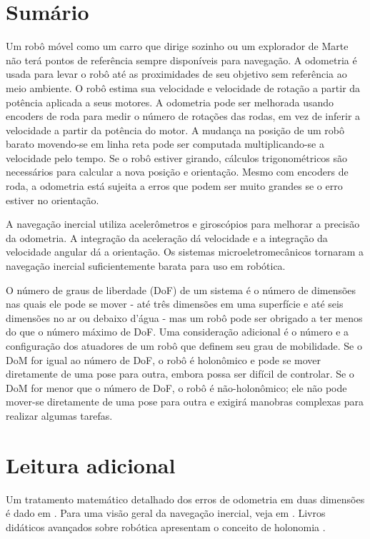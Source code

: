 \section{Sumário}

Um robô móvel como um carro que dirige sozinho ou um explorador de Marte não terá pontos de referência sempre disponíveis para navegação. A odometria é usada para levar o robô até as proximidades de seu objetivo sem referência ao meio ambiente. O robô estima sua velocidade e velocidade de rotação a partir da potência aplicada a seus motores. A odometria pode ser melhorada usando encoders de roda para medir o número de rotações das rodas, em vez de inferir a velocidade a partir da potência do motor. A mudança na posição de um robô barato movendo-se em linha reta pode ser computada multiplicando-se a velocidade pelo tempo. Se o robô estiver girando, cálculos trigonométricos são necessários para calcular a nova posição e orientação. Mesmo com encoders de roda, a odometria está sujeita a erros que podem ser muito grandes se o erro estiver no orientação.

A navegação inercial utiliza acelerômetros e giroscópios para melhorar a precisão da odometria. A integração da aceleração dá velocidade e a integração da velocidade angular dá a orientação. Os sistemas microeletromecânicos tornaram a navegação inercial suficientemente barata para uso em robótica.

O número de graus de liberdade (DoF) de um sistema é o número de dimensões nas quais ele pode se mover - até três dimensões em uma superfície e até seis dimensões no ar ou debaixo d'água - mas um robô pode ser obrigado a ter menos do que o número máximo de DoF. Uma consideração adicional é o número e a configuração dos atuadores de um robô que definem seu grau de mobilidade. Se o DoM for igual ao número de DoF, o robô é holonômico e pode se mover diretamente de uma pose para outra, embora possa ser difícil de controlar. Se o DoM for menor que o número de DoF, o robô é não-holonômico; ele não pode mover-se diretamente de uma pose para outra e exigirá manobras complexas para realizar algumas tarefas.

\section{Leitura adicional}

Um tratamento matemático detalhado dos erros de odometria em duas dimensões é dado em \cite[Sect.~5.24]{siegwart}. Para uma visão geral da navegação inercial, veja em \cite{king,oxford}. Livros didáticos avançados sobre robótica apresentam o conceito de holonomia \cite{correll,craig,siegwart,spong}.
